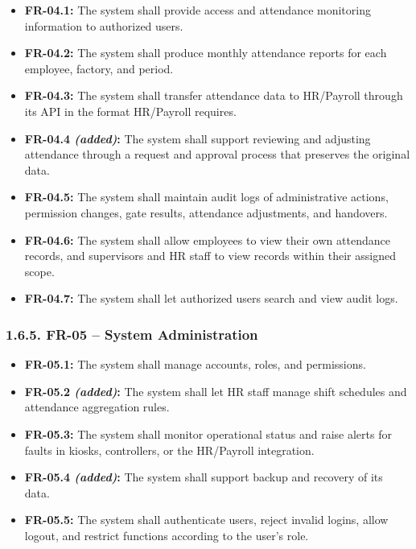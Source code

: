 \begin{itemize}[leftmargin=36pt, itemsep=2pt, topsep=4pt, parsep=2pt]
  \item \textbf{FR-04.1:} The system shall provide access and attendance monitoring information to authorized users.
  \item \textbf{FR-04.2:} The system shall produce monthly attendance reports for each employee, factory, and period.
  \item \textbf{FR-04.3:} The system shall transfer attendance data to HR/Payroll through its API in the format HR/Payroll requires.
  \item \textbf{FR-04.4 \textit{(added)}:} The system shall support reviewing and adjusting attendance through a request and approval process that preserves the original data.
  \item \textbf{FR-04.5:} The system shall maintain audit logs of administrative actions, permission changes, gate results, attendance adjustments, and handovers.
  \item \textbf{FR-04.6:} The system shall allow employees to view their own attendance records, and supervisors and HR staff to view records within their assigned scope.
  \item \textbf{FR-04.7:} The system shall let authorized users search and view audit logs.
\end{itemize}

\subsubsection*{1.6.5. FR-05 -- System Administration}

{}

\begin{itemize}[leftmargin=36pt, itemsep=2pt, topsep=4pt, parsep=2pt]
  \item \textbf{FR-05.1:} The system shall manage accounts, roles, and permissions.
  \item \textbf{FR-05.2 \textit{(added)}:} The system shall let HR staff manage shift schedules and attendance aggregation rules.
  \item \textbf{FR-05.3:} The system shall monitor operational status and raise alerts for faults in kiosks, controllers, or the HR/Payroll integration.
  \item \textbf{FR-05.4 \textit{(added)}:} The system shall support backup and recovery of its data.
  \item \textbf{FR-05.5:} The system shall authenticate users, reject invalid logins, allow logout, and restrict functions according to the user's role.
\end{itemize}

